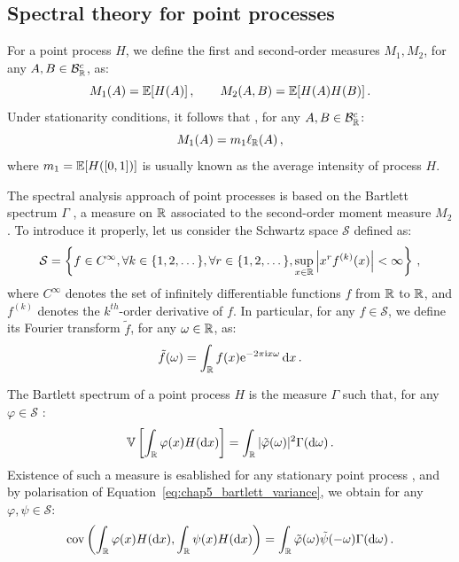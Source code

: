 \subsection{Spectral theory for point processes}\label{sec:chap5_spectral_theory}

For a point process $H$, we define the first and second-order measures $M_1, M_2$, for any $A, B\in\mathcal{B}_{{\mathbb R}}^c$, as:
\[M_1(A) = {\mathbb E}[H(A)]\,,\qquad M_2(A,B) = {\mathbb E}[H(A)H(B)]\,.\]
Under stationarity conditions, it follows that \parencite[Proposition 8.1.I]{DaleyV1}, for any $A, B\in\mathcal{B}_{{\mathbb R}}^c$:
\[M_1(A) = m_1 \ell_{{\mathbb R}}(A)\,,\]
where $m_1 = {\mathbb E}[H([0,1])]$ is usually known as the average intensity of process $H$.

The spectral analysis approach of point processes is based on the Bartlett spectrum $\Gamma$ \parencite{Bartlett1963}, 
a measure on ${\mathbb R}$ associated to the second-order moment measure $M_2$. 
To introduce it properly, let us consider the Schwartz space $\mathcal{S}$ defined as:
\[
    \mathcal S = \left\{ f \in C^\infty, \forall k \in \{1, 2, \dots\}, \forall r \in \{1, 2, \dots\},
    \sup_{x \in {\mathbb R}} \left| x^r
    f^{(k)}(x)
    \right| < \infty \right\}\,,
\] where $C^\infty$ denotes the set of infinitely differentiable functions $f$ from ${\mathbb R}$ to ${\mathbb R}$, 
and $f^{(k)}$ denotes the $k^{th}$-order derivative of $f$.
In particular, for any $f\in\mathcal{S}$, we define its Fourier transform $\tilde f$, for any $\omega\in{\mathbb R}$, as:
\[\tilde f (\omega) = \int_{{\mathbb R}}{f(x) \mathrm{e}^{-2\pi\mathrm{i} x \omega}\,{\mathrm{d}} x}\,.\]

The Bartlett spectrum of a point process $H$ is the measure $\Gamma$ such that, 
for any $\varphi\in\mathcal{S}$ \parencite[Definition 2]{Bremaud2005}:
\begin{equation}\label{eq:chap5_bartlett_variance}
    {\mathbb V}\left[\int_{{\mathbb R}}{\varphi(x)H({\mathrm{d}} x)}\right] = \int_{{\mathbb R}}{|\tilde\varphi(\omega)|^2\Gamma({\mathrm{d}} \omega)}\,.
\end{equation}
Existence of such a measure is esablished for any stationary point process \parencite[Proposition 8.2.I.(a)]{DaleyV1},
and by polarisation of Equation~\eqref{eq:chap5_bartlett_variance}, we obtain for any $\varphi, \psi \in \mathcal{S}$:
\begin{equation}\label{eq:chap5_bartlett_covariance}
    \operatorname{cov}\left(\int_{{\mathbb R}}{\varphi(x)H({\mathrm{d}} x)}, \int_{{\mathbb R}}{\psi(x)H({\mathrm{d}} x)}\right) = \int_{{\mathbb R}}{\tilde \varphi(\omega)\tilde \psi(-\omega)\Gamma({\mathrm{d}} \omega)}\,.
\end{equation}

